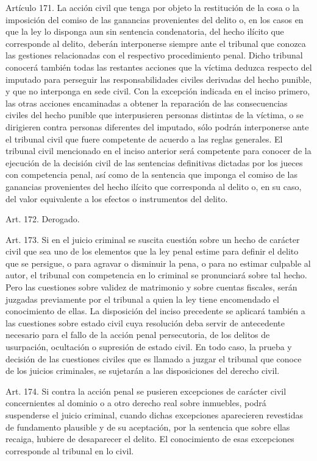     Artículo 171. La acción civil que tenga por objeto la restitución de la cosa o la imposición del comiso de las ganancias provenientes del delito o, en los casos en que la ley lo disponga aun sin sentencia condenatoria, del hecho ilícito que corresponde al delito, deberán interponerse siempre ante el tribunal que conozca las gestiones relacionadas con el respectivo procedimiento penal.
    Dicho tribunal conocerá también todas las restantes acciones que la víctima deduzca respecto del imputado para perseguir las responsabilidades civiles derivadas del hecho punible, y que no interponga en sede civil.
    Con la excepción indicada en el inciso primero, las otras acciones encaminadas a obtener la reparación de las consecuencias civiles del hecho punible que interpusieren personas distintas de la víctima, o se dirigieren contra personas diferentes del imputado, sólo podrán interponerse ante el tribunal civil que fuere competente de acuerdo a las reglas generales.
    El tribunal civil mencionado en el inciso anterior será competente para conocer de la ejecución de la decisión civil de las sentencias definitivas dictadas por los jueces con competencia penal, así como de la sentencia que imponga el comiso de las ganancias provenientes del hecho ilícito que corresponda al delito o, en su caso, del valor equivalente a los efectos o instrumentos del delito.

    Art. 172. Derogado.



    Art. 173. Si en el juicio criminal se suscita cuestión sobre un hecho de carácter civil que sea uno de los elementos que la ley penal estime para definir el delito que se persigue, o para agravar o disminuir la pena, o para no estimar culpable al autor, el tribunal con competencia en lo criminal se pronunciará sobre tal hecho.
    Pero las cuestiones sobre validez de matrimonio y sobre cuentas fiscales, serán juzgadas previamente por el tribunal a quien la ley tiene encomendado el conocimiento de ellas.
    La disposición del inciso precedente se aplicará también a las cuestiones sobre estado civil cuya resolución deba servir de antecedente necesario para el fallo de la acción penal persecutoria, de los delitos de usurpación, ocultación o supresión de estado civil.
    En todo caso, la prueba y decisión de las cuestiones civiles que es llamado a juzgar el tribunal que conoce de los juicios criminales, se sujetarán a las disposiciones del derecho civil.



    Art. 174. Si contra la acción penal se pusieren excepciones de carácter civil concernientes al dominio o a otro derecho real sobre inmuebles, podrá suspenderse el juicio criminal, cuando dichas excepciones aparecieren revestidas de fundamento plausible y de su aceptación, por la sentencia que sobre ellas recaiga, hubiere de desaparecer el delito.
    El conocimiento de esas excepciones corresponde al tribunal en lo civil.

